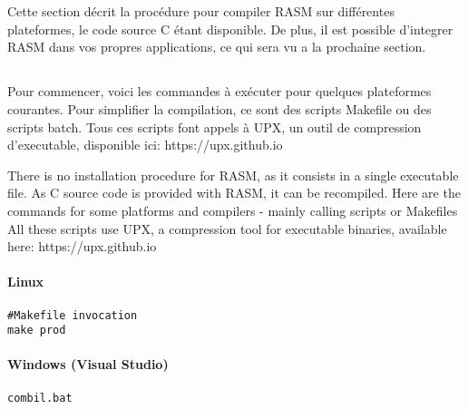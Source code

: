 \section{}

\begin{xfr}
Cette section décrit la procédure pour compiler RASM sur différentes plateformes, le code source C étant disponible. De plus, il est possible d'integrer RASM dans vos propres applications, ce qui sera vu a la prochaine section.
\end{xfr}

\subsection{}

\begin{xfr}
Pour commencer, voici les commandes à exécuter pour quelques plateformes courantes.
Pour simplifier la compilation, ce sont des scripts Makefile ou des scripts batch. 
Tous ces scripts font appels à UPX, un outil de compression d'executable, disponible ici: https://upx.github.io
\end{xfr}

\begin{xen}
There is no installation procedure for RASM, as it consists in a single executable file. As C source code is provided with RASM, it can be recompiled. 
Here are the commands for some platforms and compilers - mainly calling scripts or Makefiles 
All these scripts use UPX, a compression tool for executable binaries, available here: https://upx.github.io
\end{xen}

\paragraph{Linux}

\begin{verbatim}
#Makefile invocation
make prod
\end{verbatim}

\paragraph{Windows (Visual Studio)}

\begin{verbatim}
combil.bat
\end{verbatim}

